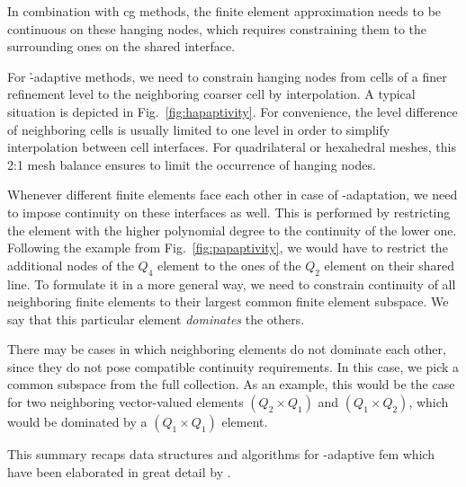 In combination with \gls{cg} methods, the finite element approximation needs to be continuous on these hanging nodes, which requires constraining them to the surrounding ones on the shared interface.

For \h-adaptive methods, we need to constrain hanging nodes from cells of a finer refinement level to the neighboring coarser cell by interpolation. A typical situation is depicted in Fig.~\ref{fig:hapaptivity}. For convenience, the level difference of neighboring cells is usually limited to one level in order to simplify interpolation between cell interfaces. For quadrilateral or hexahedral meshes, this 2:1 mesh balance ensures to limit the occurrence of hanging nodes.

Whenever different finite elements face each other in case of \p-adaptation, we need to impose continuity on these interfaces as well. This is performed by restricting the element with the higher polynomial degree to the continuity of the lower one. Following the example from Fig.~\ref{fig:papaptivity}, we would have to restrict the additional nodes of the $Q_4$ element to the ones of the $Q_2$ element on their shared line. To formulate it in a more general way, we need to constrain continuity of all neighboring finite elements to their largest common finite element subspace. We say that this particular element \textit{dominates} the others.

There may be cases in which neighboring elements do not dominate each other, since they do not pose compatible continuity requirements. In this case, we pick a common subspace from the full collection. As an example, this would be the case for two neighboring vector-valued elements $(Q_2 \times Q_1)$ and $(Q_1 \times Q_2)$, which would be dominated by a $(Q_1 \times Q_1)$ element.

This summary recaps data structures and algorithms for \hp-adaptive \gls{fem} which have been elaborated in great detail by \textcite{bangerth2009}.





